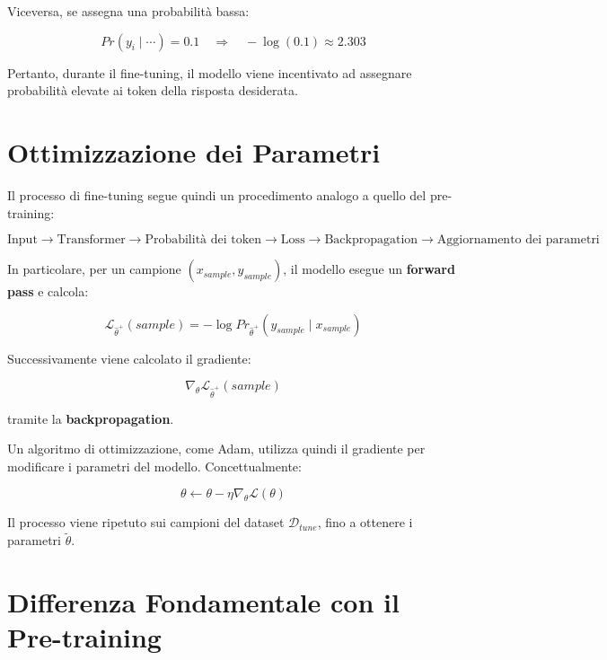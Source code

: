 Viceversa, se assegna una probabilità bassa:

\begin{equation}
Pr(y_i\mid\cdots)=0.1
\quad\Longrightarrow\quad
-\log(0.1)\approx2.303
\end{equation}

Pertanto, durante il fine-tuning, il modello viene incentivato ad
assegnare probabilità elevate ai token della risposta desiderata.

\section*{Ottimizzazione dei Parametri}

Il processo di fine-tuning segue quindi un procedimento analogo a
quello del pre-training:

\begin{equation}
\boxed{
\text{Input}
\rightarrow
\text{Transformer}
\rightarrow
\text{Probabilità dei token}
\rightarrow
\text{Loss}
\rightarrow
\text{Backpropagation}
\rightarrow
\text{Aggiornamento dei parametri}
}
\end{equation}

In particolare, per un campione $(x_{sample},y_{sample})$, il modello
esegue un \textbf{forward pass} e calcola:

\begin{equation}
\mathcal{L}_{\hat{\theta}^+}(sample)
=
-\log
Pr_{\hat{\theta}^+}
(y_{sample}\mid x_{sample})
\end{equation}

Successivamente viene calcolato il gradiente:

\begin{equation}
\nabla_\theta
\mathcal{L}_{\hat{\theta}^+}(sample)
\end{equation}

tramite la \textbf{backpropagation}.

Un algoritmo di ottimizzazione, come Adam, utilizza quindi il gradiente
per modificare i parametri del modello. Concettualmente:

\begin{equation}
\theta
\leftarrow
\theta-\eta\nabla_\theta\mathcal{L}(\theta)
\end{equation}

Il processo viene ripetuto sui campioni del dataset
$\mathcal{D}_{tune}$, fino a ottenere i parametri $\tilde{\theta}$.

\section*{Differenza Fondamentale con il Pre-training}

